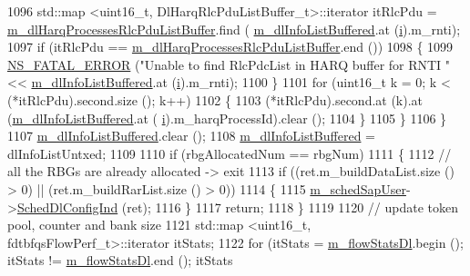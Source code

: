 \begin{DoxyCode}
1096           std::map <uint16\_t, DlHarqRlcPduListBuffer\_t>::iterator itRlcPdu =  
      \hyperlink{classns3_1_1FdTbfqFfMacScheduler_ac885f8c49550f861905b5e790e346d7b}{m\_dlHarqProcessesRlcPduListBuffer}.find (
      \hyperlink{classns3_1_1FdTbfqFfMacScheduler_a72f4bdca7a08fcc26b1618bb9e2d0cf3}{m\_dlInfoListBuffered}.at (\hyperlink{bernuolliDistribution_8m_a6f6ccfcf58b31cb6412107d9d5281426}{i}).m\_rnti);
1097           \textcolor{keywordflow}{if} (itRlcPdu == \hyperlink{classns3_1_1FdTbfqFfMacScheduler_ac885f8c49550f861905b5e790e346d7b}{m\_dlHarqProcessesRlcPduListBuffer}.end ())
1098             \{
1099               \hyperlink{group__fatal_ga5131d5e3f75d7d4cbfd706ac456fdc85}{NS\_FATAL\_ERROR} (\textcolor{stringliteral}{"Unable to find RlcPdcList in HARQ buffer for RNTI "} << 
      \hyperlink{classns3_1_1FdTbfqFfMacScheduler_a72f4bdca7a08fcc26b1618bb9e2d0cf3}{m\_dlInfoListBuffered}.at (\hyperlink{bernuolliDistribution_8m_a6f6ccfcf58b31cb6412107d9d5281426}{i}).m\_rnti);
1100             \}
1101           \textcolor{keywordflow}{for} (uint16\_t k = 0; k < (*itRlcPdu).second.size (); k++)
1102             \{
1103               (*itRlcPdu).second.at (k).at (\hyperlink{classns3_1_1FdTbfqFfMacScheduler_a72f4bdca7a08fcc26b1618bb9e2d0cf3}{m\_dlInfoListBuffered}.at (
      \hyperlink{bernuolliDistribution_8m_a6f6ccfcf58b31cb6412107d9d5281426}{i}).m\_harqProcessId).clear ();
1104             \}
1105         \}
1106     \}
1107   \hyperlink{classns3_1_1FdTbfqFfMacScheduler_a72f4bdca7a08fcc26b1618bb9e2d0cf3}{m\_dlInfoListBuffered}.clear ();
1108   \hyperlink{classns3_1_1FdTbfqFfMacScheduler_a72f4bdca7a08fcc26b1618bb9e2d0cf3}{m\_dlInfoListBuffered} = dlInfoListUntxed;
1109 
1110   \textcolor{keywordflow}{if} (rbgAllocatedNum == rbgNum)
1111     \{
1112       \textcolor{comment}{// all the RBGs are already allocated -> exit}
1113       \textcolor{keywordflow}{if} ((ret.m\_buildDataList.size () > 0) || (ret.m\_buildRarList.size () > 0))
1114         \{
1115           \hyperlink{classns3_1_1FdTbfqFfMacScheduler_adba18bbdd7247045a60bda41322253c5}{m\_schedSapUser}->\hyperlink{classns3_1_1FfMacSchedSapUser_a28f8484af5a32a45ee6c0e51770d83f7}{SchedDlConfigInd} (ret);
1116         \}
1117       \textcolor{keywordflow}{return};
1118     \}
1119 
1120   \textcolor{comment}{// update token pool, counter and bank size}
1121   std::map <uint16\_t, fdtbfqsFlowPerf\_t>::iterator itStats;
1122   \textcolor{keywordflow}{for} (itStats = \hyperlink{classns3_1_1FdTbfqFfMacScheduler_ad55ff3305031aa6d2b3d351145754972}{m\_flowStatsDl}.begin (); itStats != \hyperlink{classns3_1_1FdTbfqFfMacScheduler_ad55ff3305031aa6d2b3d351145754972}{m\_flowStatsDl}.end (); itStats

\end{DoxyCode}
